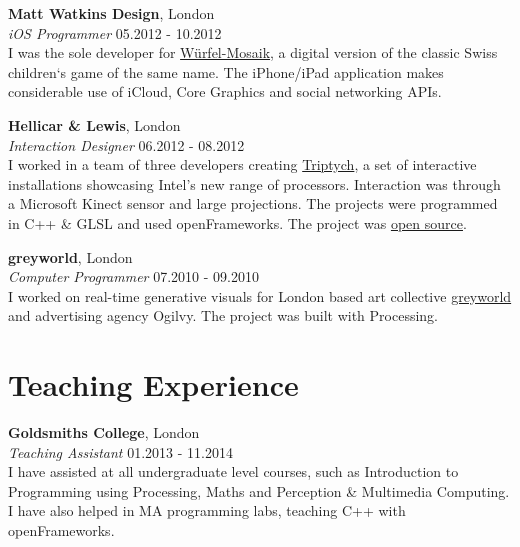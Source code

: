\documentclass[margin,line,a4paper]{resume}
\begin{document}
\begin{resume}
\textbf{Matt Watkins Design}, London \vspace{1mm}\\
\textsl{iOS Programmer} \hfill 05.2012 - 10.2012 \vspace{2mm} \\
I was the sole developer for
\href{http://wurfelmosaik.com/}{W\"{u}rfel-Mosaik}, a digital version
of the classic Swiss children`s game of the same name. The iPhone/iPad
application makes considerable use of iCloud, Core Graphics and social
networking APIs.

\textbf{Hellicar \& Lewis}, London \vspace{1mm}\\
\textsl{Interaction Designer} \hfill 06.2012 - 08.2012 \vspace{2mm} \\
I worked in a team of three developers creating
\href{http://www.hellicarandlewis.com/intel/}{Triptych},
a set of interactive installations showcasing Intel's new range of
processors. Interaction was through a Microsoft Kinect sensor and
large projections. The projects were programmed in C++ \& GLSL and
used openFrameworks. The project was
\href{https://github.com/HellicarAndLewis/Triptych}{open source}.

\textbf{greyworld}, London  \vspace{1mm}\\
\textsl{Computer Programmer} \hfill 07.2010 - 09.2010 \vspace{2mm} \\
I worked on real-time generative visuals for London
based art collective \href{http://greyworld.org}{greyworld} and
advertising agency Ogilvy. The project was built with Processing.

\section{\mysidestyle Teaching Experience}

\textbf{Goldsmiths College}, London \vspace{1mm}\\
\textsl{Teaching Assistant} \hfill 01.2013 - 11.2014 \vspace{2mm} \\
I have assisted at all undergraduate level courses, such as Introduction to Programming using Processing, Maths and Perception \& Multimedia Computing. I have also helped in  MA programming labs, teaching C++ with openFrameworks.


\end{resume}
\end{document}
